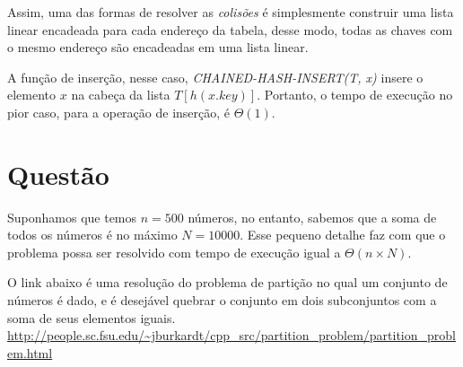 \documentclass[a4paper,12pt]{article}
\begin{document}
Assim, uma das formas de resolver as \textit{colisões} é simplesmente construir uma lista linear encadeada para cada endereço da tabela, desse modo, todas as chaves com o mesmo endereço são encadeadas em uma lista linear.

A função de inserção, nesse caso, \textit{CHAINED-HASH-INSERT(T, x)} insere o elemento $x$ na cabeça da lista $T[h(x.key)]$. Portanto, o tempo de execução no pior caso, para a operação de inserção, é $\Theta(1)$.

\section{Questão}


Suponhamos que temos $n = 500$ números, no entanto, sabemos que a soma de todos os números é no máximo $N = 10000$. Esse pequeno detalhe faz com que o problema possa ser resolvido com tempo de execução igual a $\Theta(n\times N)$.

O link abaixo é uma resolução do problema de partição no qual um conjunto de números é dado, e é desejável quebrar o conjunto em dois subconjuntos com a soma de seus elementos iguais.\\
\url{http://people.sc.fsu.edu/~jburkardt/cpp_src/partition_problem/partition_problem.html}
\end{document}
